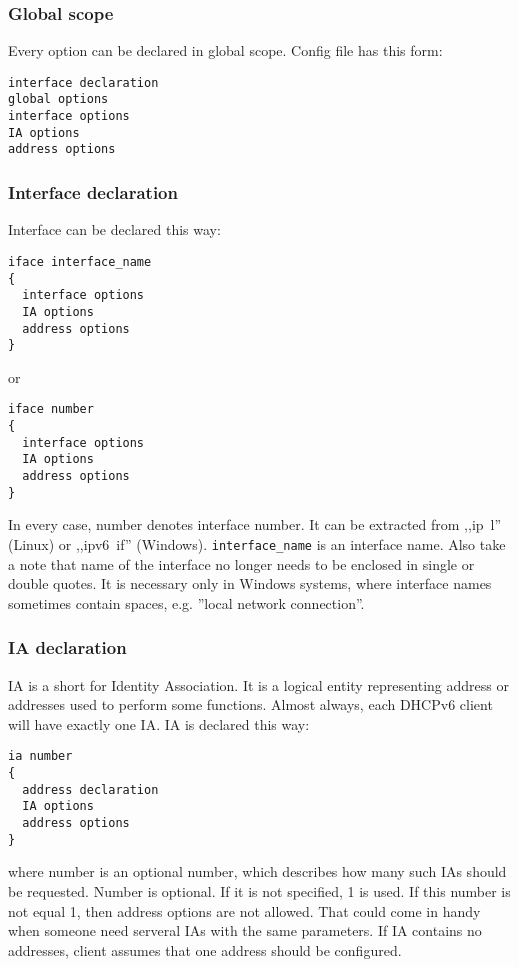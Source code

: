 \subsubsection{Global scope}

Every option can be declared in global scope.
Config file has this form:

\begin{verbatim}
interface declaration
global options
interface options
IA options
address options
\end{verbatim}

\subsubsection{Interface declaration}

Interface can be declared this way:
\begin{verbatim}
iface interface_name
{
  interface options
  IA options
  address options        
}
\end{verbatim}

or 

\begin{verbatim}
iface number 
{
  interface options
  IA options
  address options        
}
\end{verbatim}

In every case, number denotes interface number. It can be extracted
from ,,ip~l'' (Linux) or
,,ipv6~if'' (Windows). \verb+interface_name+ is an interface
name.  Also take a note that name of the interface
no longer needs to be enclosed in single or double quotes. It is
necessary only in Windows systems, where interface names sometimes
contain spaces, e.g. ''local network connection''.

\subsubsection{IA declaration}

IA is a short for Identity Association. It is a logical entity
representing address or addresses used to perform some
functions. Almost always, each DHCPv6 client will have exactly one
IA. IA is declared this way:

\begin{verbatim}
ia number
{ 
  address declaration
  IA options
  address options
}
\end{verbatim}

where number is an optional number, which describes how many such IAs
should be requested. Number is optional. If it is not specified, 1 is
used. If this number is not equal 1, then address
options are not allowed. That could come in handy when someone need
serveral IAs with the same parameters. If IA contains no addresses,
client assumes that one address should be configured.


